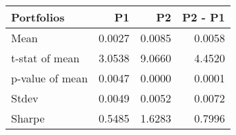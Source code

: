 \begin{tabular}{lrrr}
\toprule
Portfolios & P1 & P2 & P2 - P1 \\
\midrule
Mean & 0.0027 & 0.0085 & 0.0058 \\
t-stat of mean & 3.0538 & 9.0660 & 4.4520 \\
p-value of mean & 0.0047 & 0.0000 & 0.0001 \\
Stdev & 0.0049 & 0.0052 & 0.0072 \\
Sharpe & 0.5485 & 1.6283 & 0.7996 \\
\bottomrule
\end{tabular}
